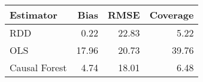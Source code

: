 \begin{table}[ht]
\centering
\begin{tabular}{lrrr}
  \hline
Estimator & Bias & RMSE & Coverage \\ 
  \hline
RDD & 0.22 & 22.83 & 5.22 \\ 
  OLS & 17.96 & 20.73 & 39.76 \\ 
  Causal Forest & 4.74 & 18.01 & 6.48 \\ 
   \hline
\end{tabular}
\end{table}
